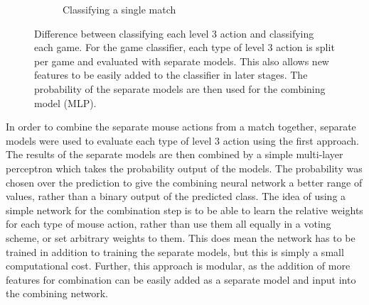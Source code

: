 \documentclass[Report.tex]{subfiles}
\begin{document}
\begin{figure}[H]
\begin{subfigure}{1\textwidth}
\caption{Classifying a single match}
\end{subfigure}
\caption{Difference between classifying each level 3 action and classifying each game. For the game classifier, each type of level 3 action is split per game and evaluated with separate models. This also allows new features to be easily added to the classifier in later stages. The probability of the separate models are then used for the combining model (MLP).}

\label{fig:game-classifier-difference}
\end{figure}

In order to combine the separate mouse actions from a match together, separate models were used to evaluate each type of level 3 action using the first approach. The results of the separate models are then combined by a simple multi-layer perceptron which takes the probability output of the models. The probability was chosen over the prediction to give the combining neural network a better range of values, rather than a binary output of the predicted class. The idea of using a simple network for the combination step is to be able to learn the relative weights for each type of mouse action, rather than use them all equally in a voting scheme, or set arbitrary weights to them. This does mean the network has to be trained in addition to training the separate models, but this is simply a small computational cost. Further, this approach is modular, as the addition of more features for combination can be easily added as a separate model and input into the combining network.
\end{document}
